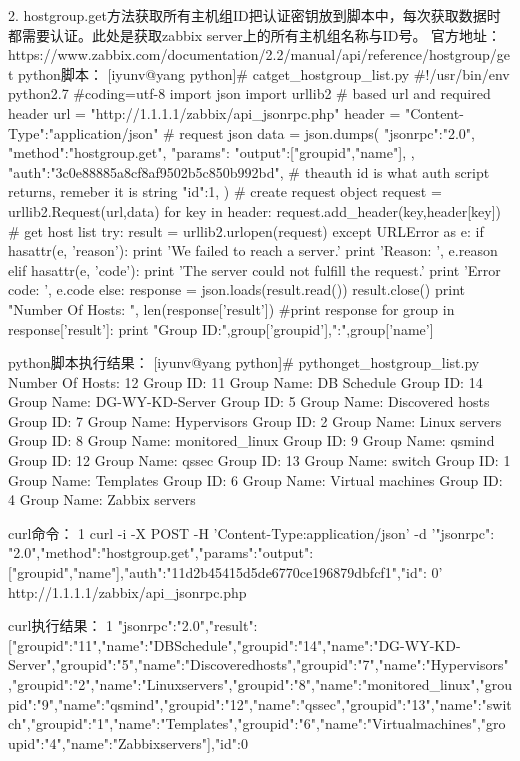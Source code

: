 2.     hostgroup.get方法获取所有主机组ID把认证密钥放到脚本中，每次获取数据时都需要认证。此处是获取zabbix server上的所有主机组名称与ID号。
官方地址：https://www.zabbix.com/documentation/2.2/manual/api/reference/hostgroup/get
python脚本：
[iyunv@yang python]# catget_hostgroup_list.py
#!/usr/bin/env python2.7
#coding=utf-8
import json
import urllib2
# based url and required header
url = "http://1.1.1.1/zabbix/api_jsonrpc.php"
header = {"Content-Type":"application/json"}
# request json
data = json.dumps(
{
   "jsonrpc":"2.0",
   "method":"hostgroup.get",
   "params":{
       "output":["groupid","name"],
   },
   "auth":"3c0e88885a8cf8af9502b5c850b992bd", # theauth id is what auth script returns, remeber it is string
   "id":1,
})
# create request object
request = urllib2.Request(url,data)
for key in header:
   request.add_header(key,header[key])
# get host list
try:
   result = urllib2.urlopen(request)
except URLError as e:
   if hasattr(e, 'reason'):
       print 'We failed to reach a server.'
       print 'Reason: ', e.reason
   elif hasattr(e, 'code'):
       print 'The server could not fulfill the request.'
       print 'Error code: ', e.code
else:
   response = json.loads(result.read())
   result.close()
   print "Number Of Hosts: ", len(response['result'])
   #print response
   for group in response['result']:
       print "Group ID:",group['groupid'],"\tGroupName:",group['name']



python脚本执行结果：
[iyunv@yang python]# pythonget_hostgroup_list.py
Number Of Hosts:  12
Group ID: 11    Group Name: DB Schedule
Group ID: 14    Group Name: DG-WY-KD-Server
Group ID: 5     Group Name: Discovered hosts
Group ID: 7     Group Name: Hypervisors
Group ID: 2     Group Name: Linux servers
Group ID: 8     Group Name: monitored_linux
Group ID: 9     Group Name: qsmind
Group ID: 12    Group Name: qssec
Group ID: 13    Group Name: switch
Group ID: 1     Group Name: Templates
Group ID: 6     Group Name: Virtual machines
Group ID: 4     Group Name: Zabbix servers



curl命令：
1
curl -i -X POST -H 'Content-Type:application/json' -d '{"jsonrpc": "2.0","method":"hostgroup.get","params":{"output":["groupid","name"]},"auth":"11d2b45415d5de6770ce196879dbfcf1","id": 0}' http://1.1.1.1/zabbix/api_jsonrpc.php



curl执行结果：
1
{"jsonrpc":"2.0","result":[{"groupid":"11","name":"DBSchedule"},{"groupid":"14","name":"DG-WY-KD-Server"},{"groupid":"5","name":"Discoveredhosts"},{"groupid":"7","name":"Hypervisors"},{"groupid":"2","name":"Linuxservers"},{"groupid":"8","name":"monitored_linux"},{"groupid":"9","name":"qsmind"},{"groupid":"12","name":"qssec"},{"groupid":"13","name":"switch"},{"groupid":"1","name":"Templates"},{"groupid":"6","name":"Virtualmachines"},{"groupid":"4","name":"Zabbixservers"}],"id":0}




